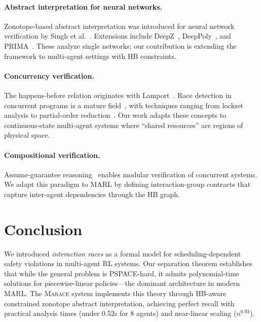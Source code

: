 \documentclass[11pt]{article}
\newcommand{\marace}{\textsc{Marace}}
\begin{document}
\paragraph{Abstract interpretation for neural networks.}
Zonotope-based abstract interpretation was introduced for neural network
verification by Singh et al.~\cite{singh2018fast,singh2019abstract}.
Extensions include DeepZ~\cite{singh2018fast}, DeepPoly~\cite{singh2019abstract},
and PRIMA~\cite{mueller2022prima}. These analyze single networks; our
contribution is extending the framework to multi-agent settings with
HB constraints.

\paragraph{Concurrency verification.}
The happens-before relation originates with Lamport~\cite{lamport1978time}.
Race detection in concurrent programs is a mature field~\cite{savage1997eraser,
flanagan2009fasttrack,huang2014maximal}, with techniques ranging from
lockset analysis to partial-order reduction~\cite{godefroid1996partial}.
Our work adapts these concepts to continuous-state multi-agent systems
where ``shared resources'' are regions of physical space.

\paragraph{Compositional verification.}
Assume-guarantee reasoning~\cite{henzinger1998you,pasareanu2008assume}
enables modular verification of concurrent systems. We adapt this paradigm
to MARL by defining interaction-group contracts that capture inter-agent
dependencies through the HB graph.


\section{Conclusion}
\label{sec:conclusion}

We introduced \emph{interaction races} as a formal model for
scheduling-dependent safety violations in multi-agent RL systems.
Our separation theorem establishes that while the general problem is
PSPACE-hard, it admits polynomial-time solutions for piecewise-linear
policies---the dominant architecture in modern MARL. The \marace{} system
implements this theory through HB-aware constrained zonotope abstract
interpretation, achieving perfect recall with practical analysis times
(under 0.52s for 8 agents) and near-linear scaling ($n^{0.93}$).
\end{document}
